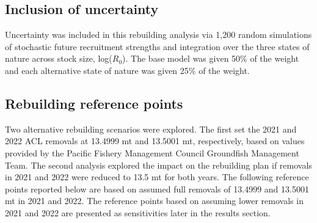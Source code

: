 \documentclass[11pt,
  english,
  a4paper,
]{article}
\begin{document}
\hypertarget{inclusion-of-uncertainty}{%
\subsection{Inclusion of uncertainty}\label{inclusion-of-uncertainty}}

\leavevmode\tagmcend\tagstructend


Uncertainty was included in this rebuilding analysis via 1,200 random simulations of stochastic future recruitment strengths and integration over the three states of nature across stock size, log({\(R_0\)\leavevmode\tagmcend\tagstructend}). The base model was given 50\% of the weight and each alternative state of nature was given 25\% of the weight.

\leavevmode\tagmcend\tagstructend\par


\hypertarget{rebuilding-reference-points}{%
\subsection{Rebuilding reference points}\label{rebuilding-reference-points}}

\leavevmode\tagmcend\tagstructend


Two alternative rebuilding scenarios were explored. The first set the 2021 and 2022 ACL removals at 13.4999 mt and 13.5001 mt, respectively, based on values provided by the Pacific Fishery Management Council Groundfish Management Team. The second analysis explored the impact on the rebuilding plan if removals in 2021 and 2022 were reduced to 13.5 mt for both years. The following reference points reported below are based on assumed full removals of 13.4999 and 13.5001 mt in 2021 and 2022. The reference points based on assuming lower removals in 2021 and 2022 are presented as sensitivities later in the results section.

\leavevmode\tagmcend\tagstructend\par

\end{document}
